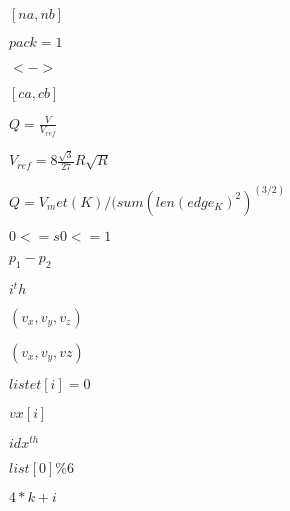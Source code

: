 \documentclass{article}
\begin{document}
$[na,nb]$
\pagebreak

$pack=1$
\pagebreak

$ <-> $
\pagebreak

$[ca,cb]$
\pagebreak

$Q=\frac{V}{V_{ref}}$
\pagebreak

$V_{ref}=8\frac{\sqrt{3}}{27}R \sqrt{R}$
\pagebreak

$ Q = V_met(K) / (sum(len(edge_K)^2)^(3/2) $
\pagebreak

$ 0 <= s0 <= 1 $
\pagebreak

$ p_1-p_2 $
\pagebreak

$i^th$
\pagebreak

$(v_x,v_y,v_z)$
\pagebreak

$(v_x,v_y,vz)$
\pagebreak

$listet[i] = 0$
\pagebreak

$vx[i]$
\pagebreak

$ idx^{th} $
\pagebreak

$list[0]\%6$
\pagebreak

$4*k+i$
\pagebreak
\end{document}
